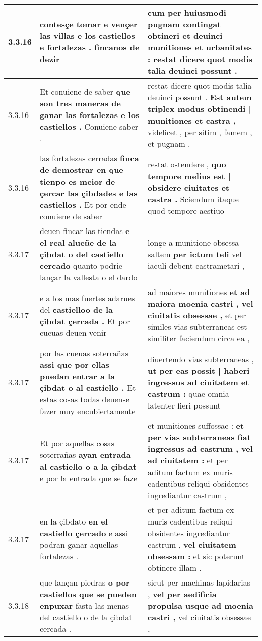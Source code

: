 \begin{tabular}{|p{1cm}|p{6.5cm}|p{6.5cm}|}
3.3.16 & contesçe tomar e vençer las villas \textbf{ e los castiellos e fortalezas . } fincanos de dezir & cum per huiusmodi pugnam \textbf{ contingat obtineri et deuinci munitiones et urbanitates : } restat dicere quot modis talia deuinci possunt . \\\hline
3.3.16 & Et conuiene de saber \textbf{ que son tres maneras de ganar las fortalezas e los castiellos . } Conuiene saber . & restat dicere quot modis talia deuinci possunt . \textbf{ Est autem triplex modus obtinendi | munitiones et castra , } videlicet , per sitim , famem , et pugnam . \\\hline
3.3.16 & las fortalezas cerradas \textbf{ finca de demostrar en que tienpo es meior de çercar las çibdades e las castiellos . } Et por ende conuiene de saber & restat ostendere , \textbf{ quo tempore melius est | obsidere ciuitates et castra . } Sciendum itaque quod tempore aestiuo \\\hline
3.3.17 & deuen fincar las tiendas \textbf{ e el real alueñe de la çibdat o del castiello cercado } quanto podrie lançar la vallesta o el dardo & longe a munitione obsessa saltem \textbf{ per ictum teli } vel iaculi debent castrametari , \\\hline
3.3.17 & e a los mas fuertes adarues del \textbf{ castielloo de la çibdat çercada . } Et por cueuas deuen venir & ad maiores munitiones \textbf{ et ad maiora moenia castri , vel ciuitatis obsessae , } et per similes vias subterraneas est similiter faciendum circa ea , \\\hline
3.3.17 & por las cueuas soterrañas \textbf{ assi que por ellas puedan entrar a la çibdat o al castiello . } Et estas cosas todas deuense fazer muy encubiertamente & diuertendo vias subterraneas , \textbf{ ut per eas possit | haberi ingressus ad ciuitatem et castrum : } quae omnia latenter fieri possunt \\\hline
3.3.17 & Et por aquellas cosas soterrañas \textbf{ ayan entrada al castiello o a la çibdat } e por la entrada que se faze & et munitiones suffossae : \textbf{ et per vias subterraneas fiat ingressus ad castrum , vel ad ciuitatem : } et per aditum factum ex muris cadentibus reliqui obsidentes ingrediantur castrum , \\\hline
3.3.17 & en la çibdato \textbf{ en el castiello çercado } e assi podran ganar aquellas fortalezas . & et per aditum factum ex muris cadentibus reliqui obsidentes ingrediantur castrum , \textbf{ vel ciuitatem obsessam : } et sic poterunt obtinere illam . \\\hline
3.3.18 & que lançan piedras \textbf{ o por castiellos que se pueden enpuxar } fasta las menas del castiello o de la çibdat cercada . & sicut per machinas lapidarias , \textbf{ vel per aedificia propulsa usque ad moenia castri , } vel ciuitatis obsessae , \\\hline

\end{tabular}
